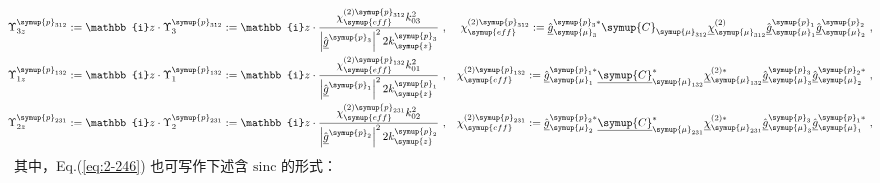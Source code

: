 \begin{subequations} \label{eq:2-249}
	\abovedisplayskip=0pt
	\belowdisplayskip=13pt
	\begin{align}
		\hspace{-0.6em} \Upsilon^{\symup{p}_{312}}_{3z} &:= \mathbb{i} z \cdot \Upsilon^{\symup{p}_{312}}_{3} := \mathbb{i} z \cdot \frac{ \chi^{(2)\symup{p}_{312}}_{\symup{eff}} k^{2}_{03} }{ \left| \hat{\underline{g}}^{\symup{p}_{3}} \right|^2 2 k^{\symup{p}_{3}}_{\symup{z}} }~, &\chi^{(2)\symup{p}_{312}}_{\symup{eff}} := \hat{\underline{g}}^{\symup{p}_{3}*}_{{{\symup{\mu}}_{3}}} \symup{C}_{{\symup{\mu}}_{312}} \underline{\chi}^{(2)}_{{\symup{\mu}}_{312}} \hat{\underline{g}}^{\symup{p}_{1}}_{{\symup{\mu}}_1} \hat{\underline{g}}^{\symup{p}_{2}}_{{\symup{\mu}}_2} \label{eq:2-249a}~, \\ \hspace{-0.6em} \Upsilon^{\symup{p}_{132}}_{1z} &:= \mathbb{i} z \cdot \Upsilon^{\symup{p}_{132}}_{1} := \mathbb{i} z \cdot \frac{ \chi^{(2)\symup{p}_{132}}_{\symup{eff}} k^{2}_{01} }{ \left| \hat{\underline{g}}^{\symup{p}_{1}} \right|^2 2 k^{\symup{p}_{1}}_{\symup{z}} }~, &{\chi}^{(2)\symup{p}_{132}}_{\symup{eff}} := \hat{\underline{g}}^{\symup{p}_{1}*}_{{\symup{\mu}}_{1}} \underline{\symup{C}}^{*}_{{\symup{\mu}}_{132}} \underline{\chi}^{(2)*}_{{\symup{\mu}}_{132}} \hat{\underline{g}}^{\symup{p}_{3}}_{{\symup{\mu}}_3} \hat{\underline{g}}^{\symup{p}_{2}*}_{{\symup{\mu}}_2} \label{eq:2-249b}~, \\ \hspace{-0.6em} \Upsilon^{\symup{p}_{231}}_{2z} &:= \mathbb{i} z \cdot \Upsilon^{\symup{p}_{231}}_{2} := \mathbb{i} z \cdot \frac{ \chi^{(2)\symup{p}_{231}}_{\symup{eff}} k^{2}_{02} }{ \left| \hat{\underline{g}}^{\symup{p}_{2}} \right|^2 2 k^{\symup{p}_{2}}_{\symup{z}} }~, &{\chi}^{(2)\symup{p}_{231}}_{\symup{eff}} := \hat{\underline{g}}^{\symup{p}_{2}*}_{{\symup{\mu}}_{2}} \underline{\symup{C}}^{*}_{{\symup{\mu}}_{231}} \underline{\chi}^{(2)*}_{{\symup{\mu}}_{231}} \hat{\underline{g}}^{\symup{p}_{3}}_{{\symup{\mu}}_3} \hat{\underline{g}}^{\symup{p}_{1}*}_{{\symup{\mu}}_1} \label{eq:2-249c}~, 
	\end{align}
\end{subequations}
其中，Eq.(\ref{eq:2-246}) 也可写作下述含 $\text{sinc}$ 的形式：
